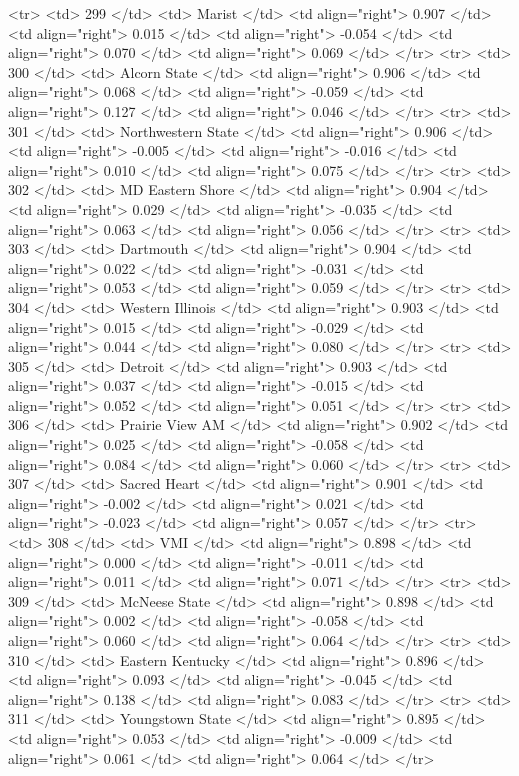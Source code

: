   <tr> <td> 299 </td> <td> Marist </td> <td align="right"> 0.907 </td> <td align="right"> 0.015 </td> <td align="right"> -0.054 </td> <td align="right"> 0.070 </td> <td align="right"> 0.069 </td> </tr>
  <tr> <td> 300 </td> <td> Alcorn State </td> <td align="right"> 0.906 </td> <td align="right"> 0.068 </td> <td align="right"> -0.059 </td> <td align="right"> 0.127 </td> <td align="right"> 0.046 </td> </tr>
  <tr> <td> 301 </td> <td> Northwestern State </td> <td align="right"> 0.906 </td> <td align="right"> -0.005 </td> <td align="right"> -0.016 </td> <td align="right"> 0.010 </td> <td align="right"> 0.075 </td> </tr>
  <tr> <td> 302 </td> <td> MD Eastern Shore </td> <td align="right"> 0.904 </td> <td align="right"> 0.029 </td> <td align="right"> -0.035 </td> <td align="right"> 0.063 </td> <td align="right"> 0.056 </td> </tr>
  <tr> <td> 303 </td> <td> Dartmouth </td> <td align="right"> 0.904 </td> <td align="right"> 0.022 </td> <td align="right"> -0.031 </td> <td align="right"> 0.053 </td> <td align="right"> 0.059 </td> </tr>
  <tr> <td> 304 </td> <td> Western Illinois </td> <td align="right"> 0.903 </td> <td align="right"> 0.015 </td> <td align="right"> -0.029 </td> <td align="right"> 0.044 </td> <td align="right"> 0.080 </td> </tr>
  <tr> <td> 305 </td> <td> Detroit </td> <td align="right"> 0.903 </td> <td align="right"> 0.037 </td> <td align="right"> -0.015 </td> <td align="right"> 0.052 </td> <td align="right"> 0.051 </td> </tr>
  <tr> <td> 306 </td> <td> Prairie View AM </td> <td align="right"> 0.902 </td> <td align="right"> 0.025 </td> <td align="right"> -0.058 </td> <td align="right"> 0.084 </td> <td align="right"> 0.060 </td> </tr>
  <tr> <td> 307 </td> <td> Sacred Heart </td> <td align="right"> 0.901 </td> <td align="right"> -0.002 </td> <td align="right"> 0.021 </td> <td align="right"> -0.023 </td> <td align="right"> 0.057 </td> </tr>
  <tr> <td> 308 </td> <td> VMI </td> <td align="right"> 0.898 </td> <td align="right"> 0.000 </td> <td align="right"> -0.011 </td> <td align="right"> 0.011 </td> <td align="right"> 0.071 </td> </tr>
  <tr> <td> 309 </td> <td> McNeese State </td> <td align="right"> 0.898 </td> <td align="right"> 0.002 </td> <td align="right"> -0.058 </td> <td align="right"> 0.060 </td> <td align="right"> 0.064 </td> </tr>
  <tr> <td> 310 </td> <td> Eastern Kentucky </td> <td align="right"> 0.896 </td> <td align="right"> 0.093 </td> <td align="right"> -0.045 </td> <td align="right"> 0.138 </td> <td align="right"> 0.083 </td> </tr>
  <tr> <td> 311 </td> <td> Youngstown State </td> <td align="right"> 0.895 </td> <td align="right"> 0.053 </td> <td align="right"> -0.009 </td> <td align="right"> 0.061 </td> <td align="right"> 0.064 </td> </tr>

